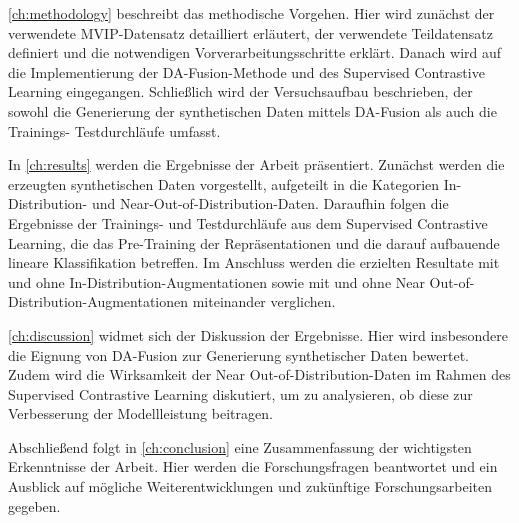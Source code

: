 \autoref{ch:methodology} beschreibt das methodische Vorgehen. Hier wird zunächst der verwendete MVIP-Datensatz detailliert erläutert, der verwendete Teildatensatz definiert und die notwendigen Vorverarbeitungsschritte erklärt. Danach wird auf die Implementierung der DA-Fusion-Methode und des Supervised Contrastive Learning eingegangen. Schließlich wird der Versuchsaufbau beschrieben, der sowohl die Generierung der synthetischen Daten mittels DA-Fusion als auch die Trainings- Testdurchläufe umfasst.

In \autoref{ch:results} werden die Ergebnisse der Arbeit präsentiert. Zunächst werden die erzeugten synthetischen Daten vorgestellt, aufgeteilt in die Kategorien In-Distribution- und Near-Out-of-Distribution-Daten. Daraufhin folgen die Ergebnisse der Trainings- und Testdurchläufe aus dem Supervised Contrastive Learning, die das Pre-Training der Repräsentationen und die darauf aufbauende lineare Klassifikation betreffen. Im Anschluss werden die erzielten Resultate mit und ohne In-Distribution-Augmentationen sowie mit und ohne Near Out-of-Distribution-Augmentationen miteinander verglichen.

\autoref{ch:discussion} widmet sich der Diskussion der Ergebnisse. Hier wird insbesondere die Eignung von DA-Fusion zur Generierung synthetischer Daten bewertet. Zudem wird die Wirksamkeit der Near Out-of-Distribution-Daten im Rahmen des Supervised Contrastive Learning diskutiert, um zu analysieren, ob diese zur Verbesserung der Modellleistung beitragen.

Abschließend folgt in \autoref{ch:conclusion} eine Zusammenfassung der wichtigsten Erkenntnisse der Arbeit. Hier werden die Forschungsfragen beantwortet und ein Ausblick auf mögliche Weiterentwicklungen und zukünftige Forschungsarbeiten gegeben.